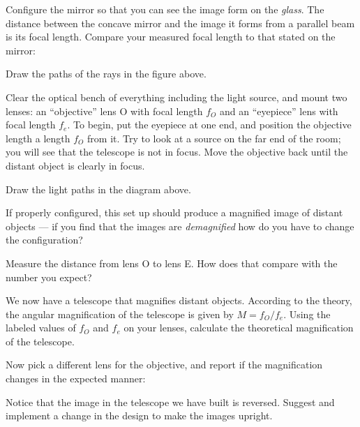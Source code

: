 \noindent Configure the mirror so that you can see the image form on
the {\it glass}. The distance between the concave mirror and the image
it forms from a parallel beam is its focal length.  Compare your
measured focal length to that stated on the mirror:

\vspace{30pt} 

\noindent Draw the paths of the rays in the figure above.


\noindent Clear the optical bench of everything including the light
source, and mount two lenses: an ``objective'' lens O with focal
length $f_O$ and an ``eyepiece'' lens with focal length $f_e$. To
begin, put the eyepiece at one end, and position the objective length
a length $f_O$ from it. Try to look at a source on the far end of the
room; you will see that the telescope is not in focus.  Move the
objective back until the distant object is clearly in focus.

\begin{figure*}[h]
\centerline{}
\caption{}
\end{figure*}

\noindent Draw the light paths in the diagram above.

\noindent If properly configured, this set up should produce a
magnified image of distant objects --- if you find that the images are
{\it demagnified} how do you have to change the configuration? 

\vspace{30pt}

\noindent Measure the distance from lens O to lens E.  How does that
compare with the number you expect? 

\vspace{30pt}

\noindent We now have a telescope that magnifies distant objects.
According to the theory, the angular magnification of the telescope is
given by $M=f_O/f_e$.  Using the labeled values of $f_O$ and $f_e$ on
your lenses, calculate the theoretical magnification of the telescope.

\vspace{30pt}

\noindent Now pick a different lens for the objective, and report if
the magnification changes in the expected manner:

\vspace{50pt}



\noindent Notice that the image in the telescope we have built is
reversed.  Suggest and implement a change in the design to make the
images upright.

\clearpage

